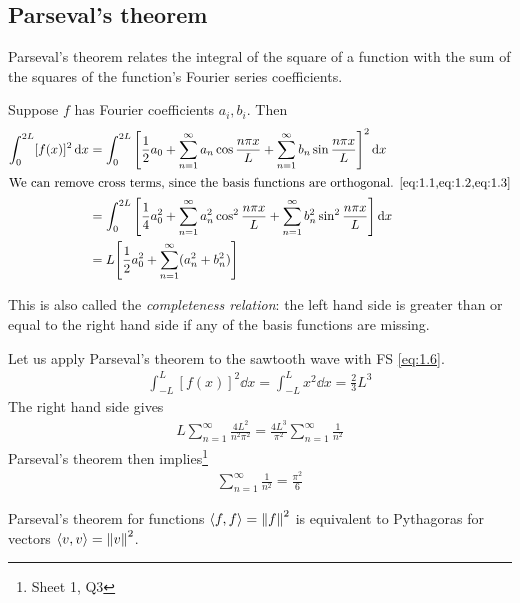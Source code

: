     \subsection{Parseval's theorem}
    Parseval's theorem relates the integral of the square of a function with the sum of the squares of the function's Fourier series coefficients.
    \begin{theorem}
        Suppose $f$ has Fourier coefficients $a_i, b_i$.
        Then
        \begin{align}
            \int_0^{2L} [f(x)]^2 \dd{x} & = \int_0^{2L} \qty[ \frac{1}{2}a_0 + \sum_{n=1}^\infty a_n \cos \frac{n \pi x}{L} + \sum_{n=1}^\infty b_n \sin \frac{n\pi x}{L} ]^2 \dd{x} \notag \\
            \intertext{We can remove cross terms, since the basis functions are orthogonal. \cref{eq:1.1,eq:1.2,eq:1.3}}
            & = \int_0^{2L} \qty[ \frac{1}{4} a_0^2 + \sum_{n=1}^\infty a_n^2 \cos^2 \frac{n\pi x}{L} + \sum_{n=1}^\infty b_n^2 \sin^2 \frac{n\pi x}{L} ] \dd{x} \notag \\
            & = L \qty[ \frac{1}{2} a_0^2 + \sum_{n=1}^\infty (a_n^2 + b_n^2) ]
        \end{align}
    \end{theorem}
    \noindent This is also called the \textit{completeness relation}: the left hand side is greater than or equal to the right hand side if any of the basis functions are missing.
    \begin{example}
        Let us apply Parseval's theorem to the sawtooth wave with FS \cref{eq:1.6}.
        \begin{align*}
            \int_{-L}^L [f(x)]^2 \dd{x} = \int_{-L}^L x^2 \dd{x} = \frac{2}{3}L^3
        \end{align*}
        The right hand side gives
        \begin{align*}
            L \sum_{n=1}^\infty \frac{4L^2}{n^2 \pi^2} = \frac{4 L^3}{\pi^2} \sum_{n=1}^\infty \frac{1}{n^2}
        \end{align*}
        Parseval's theorem then implies\footnote{Sheet 1, Q3}
        \begin{align*}
            \sum_{n=1}^\infty \frac{1}{n^2} = \frac{\pi^2}{6}
        \end{align*}
    \end{example}
    \begin{note}
        Parseval's theorem for functions $\left\langle{f, f}\right\rangle = \left \lVert f \right \rVert^2$ is equivalent to Pythagoras for vectors $\left\langle{v, v}\right\rangle = \left \lVert v \right \rVert^2$.
    \end{note} 

